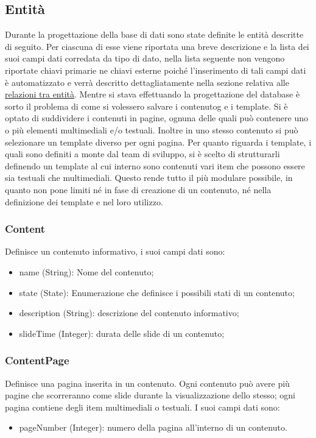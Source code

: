 \subsection{Entità}
Durante la progettazione della base di dati sono state definite le entità descritte di seguito.
Per ciascuna di esse viene riportata una breve descrizione e la lista dei suoi campi dati corredata da tipo di dato, nella lista seguente non vengono riportate chiavi primarie ne chiavi esterne poiché l'inserimento di tali campi dati è automatizzato e verrà descritto dettagliatamente nella sezione relativa alle \hyperref[rel]{relazioni tra entità}.
Mentre si stava effettuando la progettazione del database è sorto il problema di come si volessero salvare i \gls{contenutog} e i template. Si è optato di suddividere i contenuti in pagine, ognuna delle quali può contenere uno o più elementi multimediali e/o testuali. Inoltre in uno stesso contenuto si può selezionare un template diverso per ogni pagina. Per quanto riguarda i template, i quali sono definiti a monte dal team di sviluppo, si è scelto di strutturarli definendo un template al cui interno sono contenuti vari item che possono essere sia testuali che multimediali. Questo rende tutto il più modulare possibile, in quanto non pone limiti né in fase di creazione di un contenuto, né nella definizione dei template e nel loro utilizzo. 
\subsubsection{Content}
Definisce un contenuto informativo, i suoi campi dati sono:
\begin{itemize}
    \item name (String): Nome del contenuto;
    \item state (State): Enumerazione che definisce i possibili stati di un contenuto;
    \item description (String): descrizione del contenuto informativo;
    \item slideTime (Integer): durata delle slide di un contenuto;
\end{itemize}

\subsubsection{ContentPage}
Definisce una pagina inserita in un contenuto. Ogni contenuto può avere più pagine che scorreranno come slide durante la visualizzazione dello stesso; ogni pagina contiene degli item multimediali o testuali. I suoi campi dati sono:
\begin{itemize}
    \item pageNumber (Integer): numero della pagina all’interno di un contenuto.
\end{itemize}

